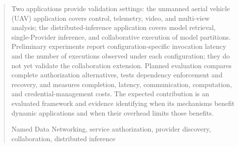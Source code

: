 \documentclass[
    doctoral,
    proposal,
    showabstract,
    secnum,
    nohyphenation,
    pdfonly,
    noboundcover
]{uofm}
\begin{document}
\begin{abstract}
Two applications provide validation settings: the unmanned aerial vehicle (UAV) application covers control, telemetry, video, and multi-view analysis; the distributed-inference application covers model retrieval, single-Provider inference, and collaborative execution of model partitions. Preliminary experiments report configuration-specific invocation latency and the number of executions observed under each configuration; they do not yet validate the collaboration extension. Planned evaluation compares complete authorization alternatives, tests dependency enforcement and recovery, and measures completion, latency, communication, computation, and credential-management costs. The expected contribution is an evaluated framework and evidence identifying when its mechanisms benefit dynamic applications and when their overhead limits those benefits.
\begin{keywords}
Named Data Networking, service authorization, provider discovery, collaboration, distributed inference
\end{keywords}
\end{abstract}
\tableofcontents
\mainmatter
\newcommand{\proposalroot}{.}

\appendix



\end{document}
